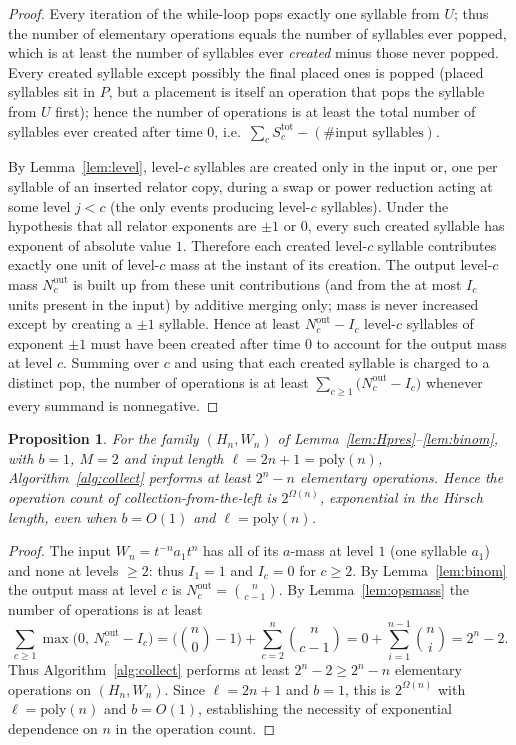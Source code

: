 \documentclass{amsart}
\newtheorem{proposition}{Proposition}
\theoremstyle{definition}
\begin{document}
\begin{proof}
Every iteration of the while-loop pops exactly one syllable from $U$; thus the number of
elementary operations equals the number of syllables ever popped, which is at least the number
of syllables ever \emph{created} minus those never popped. Every created syllable except possibly
the final placed ones is popped (placed syllables sit in $P$, but a placement is itself an
operation that pops the syllable from $U$ first); hence the number of operations is at least the
total number of syllables ever created after time $0$, i.e.\ $\sum_c S_c^{\mathrm{tot}}-(\text{\#
input syllables})$.

By Lemma~\ref{lem:level}, level-$c$ syllables are created only in the input or, one per syllable
of an inserted relator copy, during a swap or power reduction acting at some level $j<c$ (the
only events producing level-$c$ syllables). Under the hypothesis that all relator exponents are
$\pm1$ or $0$, every such created syllable has exponent of absolute value $1$. Therefore each
created level-$c$ syllable contributes exactly one unit of level-$c$ mass at the instant of its
creation. The output level-$c$ mass $N_c^{\mathrm{out}}$ is built up from these unit
contributions (and from the at most $I_c$ units present in the input) by additive merging only;
mass is never increased except by creating a $\pm1$ syllable. Hence at least
$N_c^{\mathrm{out}}-I_c$ level-$c$ syllables of exponent $\pm1$ must have been created after time
$0$ to account for the output mass at level $c$. Summing over $c$ and using that each created
syllable is charged to a distinct pop, the number of operations is at least
$\sum_{c\ge1}\bigl(N_c^{\mathrm{out}}-I_c\bigr)$ whenever every summand is nonnegative.
\end{proof}

\begin{proposition}\label{prop:lower}
For the family $(H_n,W_n)$ of Lemma~\ref{lem:Hpres}--\ref{lem:binom}, with $b=1$, $M=2$ and
input length $\ell=2n+1=\mathrm{poly}(n)$, Algorithm~\ref{alg:collect} performs at least
$2^{n}-n$ elementary operations. Hence the operation count of collection-from-the-left is
$2^{\Omega(n)}$, exponential in the Hirsch length, even when $b=O(1)$ and $\ell=\mathrm{poly}(n)$.
\end{proposition}

\begin{proof}
The input $W_n=t^{-n}a_1 t^n$ has all of its $a$-mass at level $1$ (one syllable $a_1$) and
none at levels $\ge2$: thus $I_1=1$ and $I_c=0$ for $c\ge2$. By Lemma~\ref{lem:binom} the output
mass at level $c$ is $N_c^{\mathrm{out}}=\binom{n}{c-1}$. By Lemma~\ref{lem:opsmass} the number
of operations is at least
\[
\sum_{c\ge1}\max\!\bigl(0,\,N_c^{\mathrm{out}}-I_c\bigr)
=\bigl(\binom n0-1\bigr)+\sum_{c=2}^{n}\binom{n}{c-1}
=0+\sum_{i=1}^{n-1}\binom ni
=2^{n}-2 .
\]
Thus Algorithm~\ref{alg:collect} performs at least $2^n-2\ge 2^n-n$ elementary operations on
$(H_n,W_n)$. Since $\ell=2n+1$ and $b=1$, this is $2^{\Omega(n)}$ with $\ell=\mathrm{poly}(n)$
and $b=O(1)$, establishing the necessity of exponential dependence on $n$ in the operation
count.
\end{proof}
\end{document}
